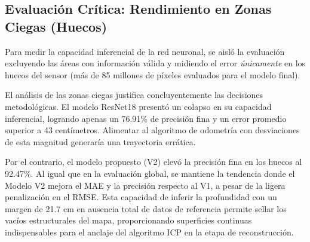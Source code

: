 \documentclass[12pt, a4, twoside, openany]{report}
\begin{document}
\subsection{Evaluación Crítica: Rendimiento en Zonas Ciegas (Huecos)}

Para medir la capacidad inferencial de la red neuronal, se aisló la evaluación excluyendo las áreas con información válida y midiendo el error \textit{únicamente} en los huecos del sensor (más de 85 millones de píxeles evaluados para el modelo final).

\begin{table}[H]
\centering
\caption{Rendimiento inferencial del modelo (Exclusivo en Zonas Ciegas/Huecos).}
\label{tab:depth_holes_metrics}
\end{table}

El análisis de las zonas ciegas justifica concluyentemente las decisiones metodológicas. El modelo ResNet18 presentó un colapso en su capacidad inferencial, logrando apenas un 76.91\% de precisión fina y un error promedio superior a 43 centímetros. Alimentar al algoritmo de odometría con desviaciones de esta magnitud generaría una trayectoria errática.

Por el contrario, el modelo propuesto (V2) elevó la precisión fina en los huecos al 92.47\%. Al igual que en la evaluación global, se mantiene la tendencia donde el Modelo V2 mejora el MAE y la precisión respecto al V1, a pesar de la ligera penalización en el RMSE. Esta capacidad de inferir la profundidad con un margen de 21.7 cm en ausencia total de datos de referencia permite sellar los vacíos estructurales del mapa, proporcionando superficies continuas indispensables para el anclaje del algoritmo ICP en la etapa de reconstrucción.
\end{document}
